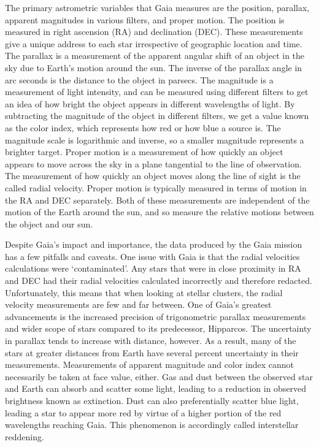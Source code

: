\documentclass[aps,prb,twocolumn,groupedaddress,nofootinbib,floatfix]{revtex4-1}
\begin{document}
The primary astrometric  variables that Gaia measures are the position, parallax, apparent magnitudes in various filters, and proper motion. The position is measured in right ascension (RA) and declination (DEC). These measurements give a unique address to each star irrespective of geographic location and time. The parallax is a measurement of the apparent angular shift of an object in the sky due to Earth's motion around the sun. The inverse of the parallax angle in arc seconds is the distance to the object in parsecs. The magnitude is a measurement of light intensity, and can be measured using different filters to get an idea of how bright the object appears in different wavelengths of light. By subtracting the magnitude of the object in different filters, we get a value known as the color index, which represents how red or how blue a source is. The magnitude scale is logarithmic and inverse, so a smaller magnitude represents a brighter target. Proper motion is a measurement of how quickly an object appears to move across the sky in a plane tangential to the line of observation. The measurement of how quickly an object moves along the line of sight is the called radial velocity. Proper motion is typically measured in terms of motion in the RA and DEC separately. Both of these measurements are independent of the motion of the Earth around the sun, and so measure the relative motions between the object and our sun.

Despite Gaia's impact and importance, the data produced by the Gaia mission has a few pitfalls and caveats. One issue with Gaia is that the radial velocities calculations were `contaminated'. Any stars that were in close proximity in RA and DEC had their radial velocities calculated incorrectly and therefore redacted. Unfortunately, this means that when looking at stellar clusters, the radial velocity measurements are few and far between. One of Gaia's greatest advancements is the increased precision of trigonometric parallax measurements and wider scope of stars compared to its predecessor, Hipparcos. The uncertainty in parallax tends to increase with distance, however. As a result, many of the stars at greater distances from Earth have several percent uncertainty in their measurements. Measurements of apparent magnitude and color index cannot necessarily be taken at face value, either. Gas and dust between the observed star and Earth can absorb and scatter some light, leading to a reduction in observed brightness known as extinction. Dust can also preferentially scatter blue light, leading a star to appear more red by virtue of a higher portion of the red wavelengths reaching Gaia. This phenomenon is accordingly called interstellar reddening.
\end{document}
